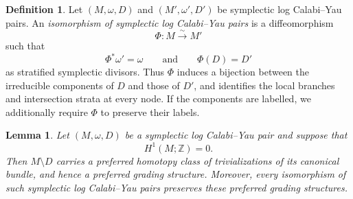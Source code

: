 \documentclass[11pt, reqno]{amsart}
\newtheorem{lemma}[theorem]{Lemma}
\theoremstyle{definition}
\newtheorem{definition}[theorem]{Definition}
\begin{document}
\begin{definition}
Let $(M,\omega,D)$ and $(M',\omega',D')$ be symplectic log
Calabi--Yau pairs. An \emph{isomorphism of symplectic log
Calabi--Yau pairs} is a diffeomorphism
\[
\Phi\colon M\xrightarrow{\sim}M'
\]
such that
\[
\Phi^*\omega'=\omega
\qquad\text{and}\qquad
\Phi(D)=D'
\]
as stratified symplectic divisors. Thus $\Phi$ induces a bijection
between the irreducible components of $D$ and those of $D'$, and
identifies the local branches and intersection strata at every node.
If the components are labelled, we additionally require $\Phi$ to
preserve their labels.
\end{definition}

\begin{lemma}\label{lem-preferred-grading}
Let $(M,\omega,D)$ be a symplectic log Calabi--Yau pair and suppose
that
\[
H^1(M;\mathbb Z)=0.
\]
Then $M\setminus D$ carries a preferred homotopy class of
trivializations of its canonical bundle, and hence a preferred grading
structure. Moreover, every isomorphism of such symplectic log
Calabi--Yau pairs preserves these preferred grading structures.
\end{lemma}
\end{document}
